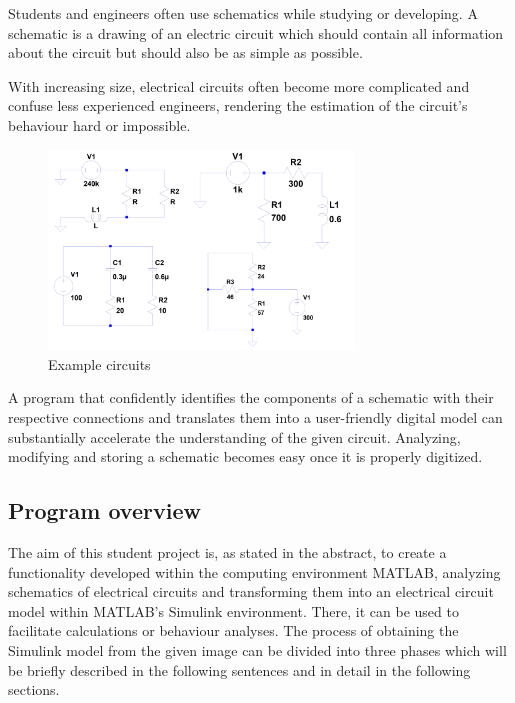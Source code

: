 \documentclass[10pt,twocolumn,letterpaper]{article}
\begin{document}
Students and engineers often use schematics while studying or developing. A schematic is a drawing of an electric circuit which should contain all information about the circuit but should also be as simple as possible.
\par
With increasing size, electrical circuits often become more complicated and confuse less experienced engineers, rendering the estimation of the circuit's behaviour hard or impossible.
\par

\begin{figure}[!ht]
\includegraphics[width = 3.2in]{img/circuits.png}
\caption{Example circuits}
\label{fig:c1}
\end{figure}

\par
A program that confidently identifies the components of a schematic with their respective connections and translates them into a user-friendly digital model can substantially accelerate the understanding of the given circuit. Analyzing, modifying and storing a schematic becomes easy once it is properly digitized.

\subsection{Program overview}
\label{subsec:over}

The aim of this student project is, as stated in the abstract, to create a functionality developed within the computing environment MATLAB, analyzing schematics of electrical circuits and transforming them into an electrical circuit model within MATLAB's Simulink environment. There, it can be used to facilitate calculations or behaviour analyses. The process of obtaining the Simulink model from the given image can be divided into three phases which will be briefly described in the following sentences and in detail in the following sections.
\par
\end{document}
